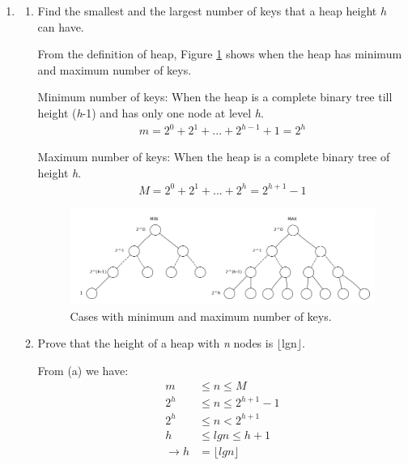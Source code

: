 \documentclass[11pts]{report}
\begin{document}
\begin{enumerate}
\item 
\begin{enumerate}
\item Find the smallest and the largest number of keys that a heap height $h$ can have.

\par From the definition of heap, Figure \ref{Figure:6a} shows when the heap has minimum and maximum number of keys.
\par Minimum number of keys: When the heap is a complete binary tree till height (\textit{h}-1) and has only one node at level \textit{h}.
\begin{align*}
m = 2^0 + 2^1 + ... + 2^{h-1} + 1 = 2^h
\end{align*}

\par Maximum number of keys: When the heap is a complete binary tree of height \textit{h}.
\begin{align*}
M = 2^0 + 2^1 + ... + 2^{h} = 2^{h+1} - 1
\end{align*}

\begin{figure}[htbp]
\begin{center}
\includegraphics[scale=0.5]{6.png}
\caption{Cases with minimum and maximum number of keys.}
\label{Figure:6a}
\end{center}
\end{figure}

\item Prove that the height of a heap with \textit{n} nodes is $\lfloor$lgn$\rfloor$.
\par From (a) we have:
\begin{align*}
m &\leq n \leq M \\
2^h &\leq n \leq 2^{h+1} - 1 \\
2^h &\leq n < 2^{h+1} \\
h &\leq lgn \leq{h+1} \\
\to h &= \lfloor lgn \rfloor
\end{align*}

\end{enumerate}
\end{enumerate}
\end{document}
